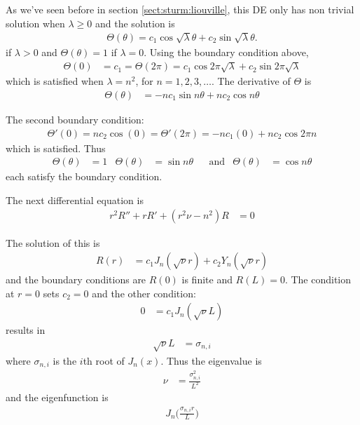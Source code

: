 As we've seen before in section \ref{sect:sturm:liouville}, this DE only has non trivial solution when $\lambda \geq 0$ and the solution is
\begin{align*}
\Theta(\theta)  = c_1 \cos \sqrt{\lambda} \theta + c_2 \sin \sqrt{\lambda} \theta.
\end{align*}
if $\lambda >0$ and $\Theta(\theta)=1$ if $\lambda=0$.
%
Using the boundary condition above,
\begin{align*}
\Theta (0) & = c_1 = \Theta(2\pi) = c_1 \cos 2\pi\sqrt{\lambda} + c_2 \sin 2\pi \sqrt{\lambda}
\end{align*}
which is satisfied when $\lambda = n^2$, for $n=1,2,3,\ldots$.  The derivative of $\Theta$ is
%
\begin{align*}
\Theta(\theta) & = -n c_1 \sin n \theta + n c_2 \cos n\theta
\end{align*}

The second boundary condition:
%
\begin{align*}
\Theta'(0) = n c_2 \cos (0) = \Theta'(2\pi) = -n c_1(0) + n c_2 \cos 2\pi n
\end{align*}
which is satisfied.  Thus
%
\begin{align*}
\Theta(\theta) & = 1 &
\Theta(\theta) &= \sin n \theta & & \text{and} & \Theta(\theta) & = \cos n \theta
\end{align*}
each satisfy the boundary condition.

The next differential equation is
%
\begin{align*}
r^2 R''+ r R' + (r^2 \nu-n^2) R & = 0
\end{align*}

The solution of this is
%
\begin{align*}
R(r) & = c_1 J_n(\sqrt{\nu} r) + c_2 Y_n(\sqrt{\nu} r)
\end{align*}
and the boundary conditions are $R(0)$ is finite and $R(L)=0$.  The condition at $r=0$ sets $c_2=0$ and the other condition:
%
\begin{align*}
0 & = c_1 J_n(\sqrt{\nu}L)
\end{align*}
results in
%
\begin{align*}
\sqrt{\nu} L & = \sigma_{n,i}
\end{align*}
where $\sigma_{n,i}$ is the $i$th root of $J_n(x)$.  Thus the eigenvalue is
%
\begin{align*}
\nu & = \frac{\sigma_{n,i}^2}{L^2}
\end{align*}
and the eigenfunction is
%
\begin{align*}
J_n\biggl(\frac{\sigma_{n,i} r}{L} \biggr)
\end{align*}

